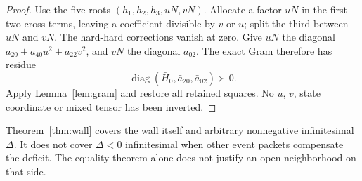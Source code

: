 \begin{proof}
Use the five roots $(h_1,h_2,h_3,uN,vN)$. Allocate a factor $uN$ in the first two cross terms, leaving a coefficient divisible by $v$ or $u$; split the third between $uN$ and $vN$. The hard-hard corrections vanish at zero. Give $uN$ the diagonal $a_{20}+a_{40}u^2+a_{22}v^2$, and $vN$ the diagonal $a_{02}$. The exact Gram therefore has residue
\[
\operatorname{diag}(\bar H_0,\bar a_{20},\bar a_{02})\succ0.
\]
Apply Lemma~\ref{lem:gram} and restore all retained squares. No $u$, $v$, state coordinate or mixed tensor has been inverted.
\end{proof}

Theorem~\ref{thm:wall} covers the wall itself and arbitrary nonnegative infinitesimal $\Delta$. It does not cover $\Delta<0$ infinitesimal when other event packets compensate the deficit. The equality theorem alone does not justify an open neighborhood on that side.
